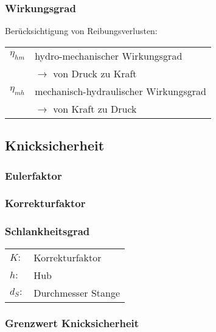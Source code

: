 \subsubsection{Wirkungsgrad}
Berücksichtigung von Reibungsverlusten: \\

\begin{tabular}{ll}
$\eta_{hm}$ &  hydro-mechanischer Wirkungsgrad \\ & $\rightarrow$ von Druck zu Kraft\\
$\eta_{mh}$ & mechanisch-hydraulischer Wirkungsgrad\\ &  $\rightarrow$ von Kraft zu Druck\\
\end{tabular}


\subsection{Knicksicherheit}
\subsubsection*{Eulerfaktor}

\subsubsection*{Korrekturfaktor}

\subsubsection*{Schlankheitsgrad}
\begin{tabular}{ll}
$K:$ & Korrekturfaktor \\
$h:$ & Hub \\
$d_S:$ & Durchmesser Stange
\end{tabular}


\subsubsection*{Grenzwert Knicksicherheit}

